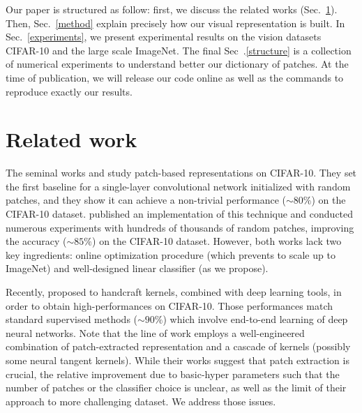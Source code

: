 \documentclass{article}
\begin{document}
Our paper is structured as follow: first, we discuss the related works (Sec.~\ref{related_work}). Then, Sec.~\ref{method} explain precisely how our visual representation is built. In Sec.~\ref{experiments}, we present experimental results on the vision datasets CIFAR-10 and the large scale  ImageNet. The final Sec~.\ref{structure} is a collection of numerical experiments to understand better our dictionary of patches. At the time of publication, we will release our code online as well as the commands to reproduce exactly our results.





\section{Related work}
\label{related_work}

The seminal works \cite{coates2011analysis} and \cite{coates2011importance}  study patch-based representations on CIFAR-10.
They set the first baseline for a single-layer convolutional network initialized with random patches, and they show it  can achieve a non-trivial performance ($\sim 80 \%$) on the CIFAR-10 dataset. 
 \cite{recht2019imagenet} published an implementation of this technique and conducted numerous experiments with hundreds of thousands of random patches, improving the accuracy ($\sim 85 \%$) on the CIFAR-10 dataset.
However, both works lack two key ingredients: online optimization procedure  (which prevents to scale up to ImageNet) and well-designed linear classifier (as we propose).



Recently, \citep{li2019enhanced,shankar2020neural} proposed to handcraft kernels, combined with deep learning tools, in order to obtain high-performances on CIFAR-10.
Those performances  match standard supervised methods ($\sim 90\%$) which involve end-to-end learning of deep neural networks.
Note that the line of work \citep{li2019enhanced,shankar2020neural,mairal2016end} employs a well-engineered combination of patch-extracted representation and a cascade of kernels (possibly some neural tangent kernels).
While their works suggest that patch extraction is crucial, the relative improvement due to basic-hyper parameters such that the number of patches or the classifier choice is unclear, as well as the limit of their approach to more challenging dataset.
We address those issues.
\end{document}
